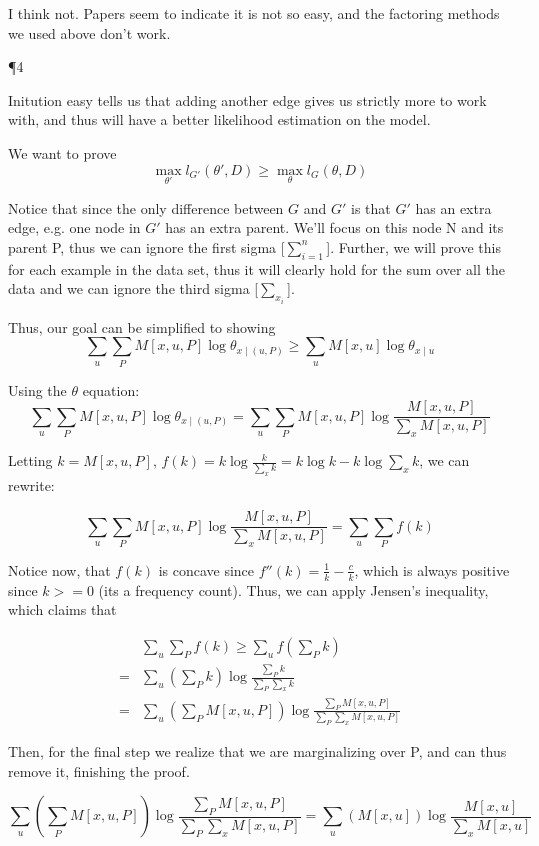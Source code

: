 I think not. Papers seem to indicate it is not so easy, and the factoring methods we used above don't work.


\P 4

Initution easy tells us that adding another edge gives us strictly more to work with, and thus will have a better likelihood estimation on the model.

We want to prove 
\[
\max_{\theta'} l_{G'} (\theta', D) \ge \max_{\theta} l_{G} (\theta, D)
\]

Notice that since the only difference between $G$ and $G'$ is that $G'$ has an extra edge, e.g. one node in $G'$ has an extra parent. We'll focus on this node N and its parent P, thus we can ignore the first sigma [$\sum_{i=1}^n$]. Further, we will prove this for each example in the data set, thus it will clearly hold for the sum over all the data and we can ignore the third sigma [$\sum_{x_i}$].

Thus, our goal can be simplified to showing
\[
\sum_{u} \sum_{P} M[x,u,P] \log \theta_{x \mid (u,P)} \ge \sum_{u} M[x,u] \log \theta_{x \mid u} 
\]

Using the $\theta$ equation:
\[
\sum_{u} \sum_{P} M[x,u,P] \log \theta_{x \mid (u,P)} = \sum_{u} \sum_{P} M[x,u,P] \log \frac{M[x,u,P]}{\sum_x M[x,u,P]}
\]

Letting $k = M[x,u,P]$, $f(k) = k \log \frac{k}{\sum_x k} = k \log k - k \log{\sum_x k} $, we can rewrite:

\[
\sum_{u} \sum_{P} M[x,u,P] \log \frac{M[x,u,P]}{\sum_x M[x,u,P]} = \sum_{u} \sum_{P} f(k)
\]

Notice now, that $f(k)$ is concave since $f''(k) = \frac{1}{k}-\frac{c}{k}$, which is always positive since $k >=0$ (its a frequency count). Thus, we can apply Jensen's inequality, which claims that 

\begin{align*}
& \sum_{u} \sum_{P} f(k) \ge \sum_{u} f(\sum_{P} k) \\ =   & \sum_{u} (\sum_{P} k) \log \frac{\sum_{P} k}{\sum_{P} \sum_x k} \\
=   & \sum_{u} (\sum_{P} M[x,u,P]) \log \frac{\sum_{P} M[x,u,P]}{\sum_{P} \sum_x M[x,u,P]}
\end{align*}

Then, for the final step we realize that we are marginalizing over P, and can thus remove it, finishing the proof.

\[
\sum_{u} (\sum_{P} M[x,u,P]) \log \frac{\sum_{P} M[x,u,P]}{\sum_{P} \sum_x M[x,u,P]} = \sum_{u} ( M[x,u]) \log \frac{M[x,u]}{\sum_x M[x,u]}
\]

